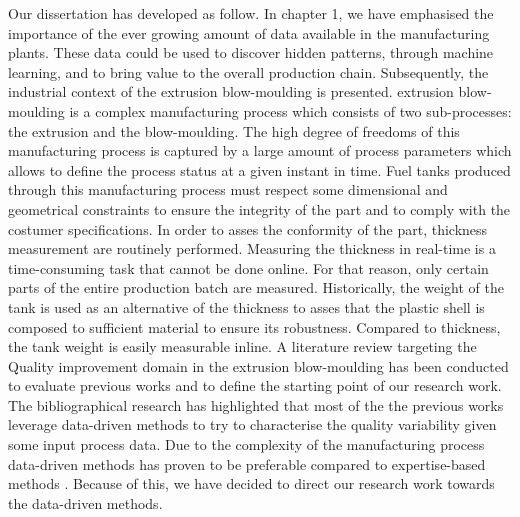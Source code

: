 Our dissertation has developed as follow. In chapter 1, we have emphasised the importance of the ever growing amount of data available in the manufacturing plants. These data could be used to discover hidden patterns, through machine learning, and to bring value to the overall production chain. Subsequently, the industrial context of the extrusion blow-moulding is presented. extrusion blow-moulding is a complex manufacturing process which consists of two sub-processes: the extrusion and the blow-moulding. The high degree of freedoms of this manufacturing process is captured by a large amount of process parameters which allows to define the process status at a given instant in time. Fuel tanks produced through this manufacturing process must respect some dimensional and geometrical constraints to ensure the integrity of the part and to comply with the costumer specifications. In order to asses the conformity of the part, thickness measurement are routinely performed. Measuring the thickness in real-time is a time-consuming task that cannot be done online. For that reason, only certain parts of the entire production batch are measured. Historically, the weight of the tank is used as an alternative of the thickness to asses that the plastic shell is composed to sufficient material to ensure its robustness. Compared to thickness, the tank weight is easily measurable inline. A literature review targeting the Quality improvement domain in the extrusion blow-moulding has been conducted to evaluate previous works and to define the starting point of our research work. The bibliographical research has highlighted that most of the the previous works leverage data-driven methods to try to characterise the quality variability given some input process data. Due to the complexity of the manufacturing process data-driven methods has proven to be preferable compared to expertise-based methods . Because of this, we have decided to direct our research work towards the data-driven methods.
